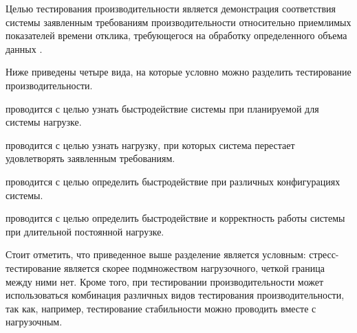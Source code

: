 Целью тестирования производительности является демонстрация соответствия системы заявленным требованиям производительности относительно приемлимых показателей времени отклика, требующегося на обработку определенного объема данных \cite{dustin1999automated}.

Ниже приведены четыре вида, на которые условно можно разделить тестирование производительности.
\begin{description}[noitemsep]
	\item [Нагрузочное тестирование] проводится с целью узнать быстродействие системы при планируемой для системы нагрузке.
	\item [Стресс-тестирование] проводится с целью узнать нагрузку, при которых система перестает удовлетворять заявленным требованиям.
	\item [Конфигурационное тестирование] проводится с целью определить быстродействие при различных конфигурациях системы.
	\item [Тестирование стабильности] проводится с целью определить быстродействие и корректность работы системы при длительной постоянной нагрузке.
\end{description}

Стоит отметить, что приведенное выше разделение является условным: стресс-тестирование является скорее подмножеством нагрузочного, четкой граница между ними нет. Кроме того, при тестировании производительности может использоваться комбинация различных видов тестирования производительности, так как, например, тестирование стабильности можно проводить вместе с нагрузочным.

